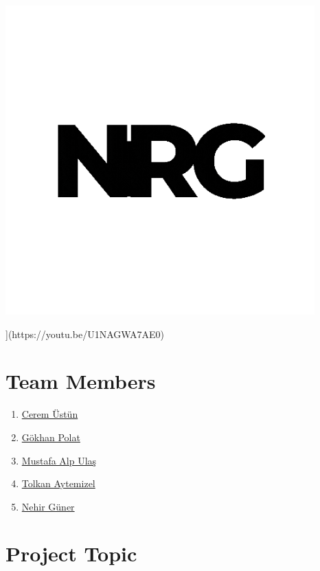 \documentclass[
  11pt,
  a4paper,
  DIV=11,
  numbers=noendperiod]{scrartcl}
\author{}
\date{}
\begin{document}
\begin{center}
\includegraphics[width=4.6875in,height=\textheight]{docs/gif.gif}
\end{center}
{]}(https://youtu.be/U1NAGWA7AE0)

\section{Team Members}\label{team-members}

\begin{enumerate}
\def\labelenumi{\arabic{enumi}.}
\item
  \href{https://emu-hacettepe-analytics.github.io/emu430-fall2024-ceremustun/}{Cerem
  Üstün}
\item
  \href{https://emu-hacettepe-analytics.github.io/emu430-fall2024-qokhanp/}{Gökhan
  Polat}
\item
  \href{https://emu-hacettepe-analytics.github.io/emu430-fall2024-mustafalpulaslab/}{Mustafa
  Alp Ulaş}
\item
  \href{https://emu-hacettepe-analytics.github.io/emu430-fall2024-taytemizel/}{Tolkan
  Aytemizel}
\item
  \href{https://emu-hacettepe-analytics.github.io/emu430-fall2024-NehirGUNER/}{Nehir
  Güner}
\end{enumerate}

\section{Project Topic}\label{project-topic}
\end{document}
